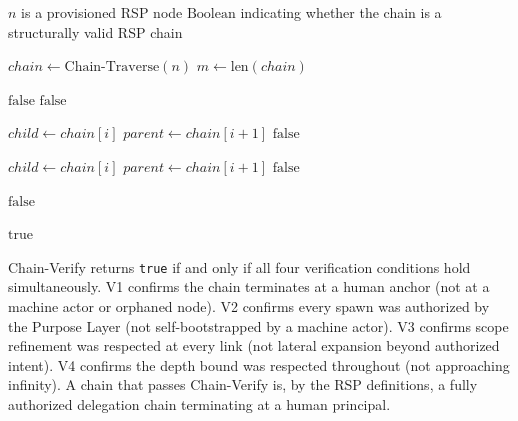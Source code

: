 \begin{algorithm}
\caption{Chain-Verify($n$) --- Verify the authorization chain from node $n$ to human anchor}
\label{alg:chain-verify}
\begin{algorithmic}[1]
\REQUIRE $n$ is a provisioned RSP node
\ENSURE $\text{Boolean}$ indicating whether the chain is a structurally valid RSP chain

\STATE $chain \leftarrow \text{Chain-Traverse}(n)$
\STATE $m \leftarrow \text{len}(chain)$

\STATE {}
    \STATE \RETURN $\text{false}$ 
\ENDIF
{}
    \STATE \RETURN $\text{false}$ 
\ENDIF

\STATE {}
    \STATE $child \leftarrow chain[i]$
    \STATE $parent \leftarrow chain[i+1]$
        \STATE \RETURN $\text{false}$ 
    \ENDIF
\ENDFOR

\STATE {}
    \STATE $child \leftarrow chain[i]$
    \STATE $parent \leftarrow chain[i+1]$
        \STATE \RETURN $\text{false}$ 
    \ENDIF
\ENDFOR

\STATE {}
        \STATE \RETURN $\text{false}$ 
    \ENDIF
\ENDFOR

\RETURN $\text{true}$
\end{algorithmic}
\end{algorithm}

Chain-Verify returns \texttt{true} if and only if all four verification conditions hold simultaneously. V1 confirms the chain terminates at a human anchor (not at a machine actor or orphaned node). V2 confirms every spawn was authorized by the Purpose Layer (not self-bootstrapped by a machine actor). V3 confirms scope refinement was respected at every link (not lateral expansion beyond authorized intent). V4 confirms the depth bound was respected throughout (not approaching infinity). A chain that passes Chain-Verify is, by the RSP definitions, a fully authorized delegation chain terminating at a human principal.

